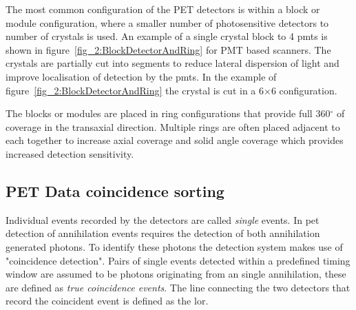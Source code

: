 %
The most common configuration of the PET detectors is within a block or module configuration, where a smaller number of photosensitive detectors to number of crystals is used. An example of a single crystal block to 4 \glspl{pmt} is shown in figure~\ref{fig_2:BlockDetectorAndRing} for PMT based scanners. The crystals are partially cut into segments to reduce lateral dispersion of light and improve localisation of detection by the \glspl{pmt}. In the example of figure~\ref{fig_2:BlockDetectorAndRing} the crystal is cut in a 6$\times$6 configuration.

The blocks or modules are placed in ring configurations that provide full 360$^{\circ}$ of coverage in the transaxial direction. Multiple rings are often placed adjacent to each together to increase axial coverage and solid angle coverage which provides increased detection sensitivity. 

\subsection{PET Data coincidence sorting}
Individual events recorded by the detectors are called \textit{single} events. In \gls{pet} detection of annihilation events requires the detection of both annihilation generated photons. To identify these photons the detection system makes use of "coincidence detection". Pairs of single events detected within a predefined timing window are assumed to be photons originating from an single annihilation, these are defined as \textit{true coincidence events}.
The line connecting the two detectors that record the coincident event is defined as the \gls{lor}. 

